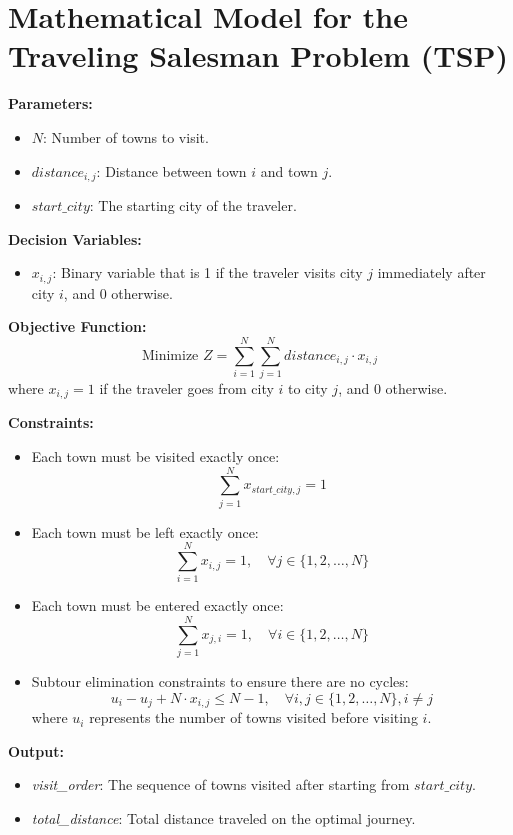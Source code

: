 \documentclass{article}
\begin{document}
\section*{Mathematical Model for the Traveling Salesman Problem (TSP)}

\textbf{Parameters:}
\begin{itemize}
    \item $N$: Number of towns to visit.
    \item $distance_{i,j}$: Distance between town $i$ and town $j$.
    \item $start\_city$: The starting city of the traveler.
\end{itemize}

\textbf{Decision Variables:}
\begin{itemize}
    \item $x_{i,j}$: Binary variable that is 1 if the traveler visits city $j$ immediately after city $i$, and 0 otherwise.
\end{itemize}

\textbf{Objective Function:}
\begin{equation}
\text{Minimize } Z = \sum_{i=1}^{N} \sum_{j=1}^{N} distance_{i,j} \cdot x_{i,j}
\end{equation}
where \(x_{i,j} = 1\) if the traveler goes from city \(i\) to city \(j\), and 0 otherwise.

\textbf{Constraints:}
\begin{itemize}
    \item Each town must be visited exactly once:
    \begin{equation}
    \sum_{j=1}^{N} x_{start\_city,j} = 1
    \end{equation}

    \item Each town must be left exactly once:
    \begin{equation}
    \sum_{i=1}^{N} x_{i,j} = 1, \quad \forall j \in \{1, 2, \ldots, N\}
    \end{equation}

    \item Each town must be entered exactly once:
    \begin{equation}
    \sum_{j=1}^{N} x_{j,i} = 1, \quad \forall i \in \{1, 2, \ldots, N\}
    \end{equation}
    
    \item Subtour elimination constraints to ensure there are no cycles:
    \begin{equation}
    u_i - u_j + N \cdot x_{i,j} \leq N-1, \quad \forall i, j \in \{1, 2, \ldots, N\}, i \neq j
    \end{equation}
    where \(u_i\) represents the number of towns visited before visiting \(i\).
\end{itemize}

\textbf{Output:}
\begin{itemize}
    \item \textit{visit\_order}: The sequence of towns visited after starting from $start\_city$.
    \item \textit{total\_distance}: Total distance traveled on the optimal journey.
\end{itemize}
\end{document}
